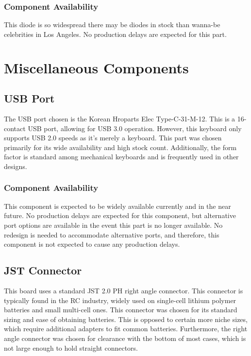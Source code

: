 \documentclass[11pt]{article}
\begin{document}
\subsubsection{Component Availability} 

This diode is so widespread there may be diodes in stock than wanna-be celebrities in Los Angeles. No production delays are expected for this part. 

\section{Miscellaneous Components}

\subsection{USB Port}

The USB port chosen is the Korean Hroparts Elec Type-C-31-M-12. This is a 16-contact USB port, allowing for USB 3.0 operation. However, this keyboard only supports USB 2.0 speeds as it's merely a keyboard. This part was chosen primarily for its wide availability and high stock count. Additionally, the form factor is standard among mechanical keyboards and is frequently used in other designs.

\subsubsection{Component Availability}

This component is expected to be widely available currently and in the near future. No production delays are expected for this component, but alternative port options are available in the event this part is no longer available. No redesign is needed to accommodate alternative ports, and therefore, this component is not expected to cause any production delays.

\subsection{JST Connector}

This board uses a standard JST 2.0 PH right angle connector. This connector is typically found in the RC industry, widely used on single-cell lithium polymer batteries and small multi-cell ones. This connector was chosen for its standard sizing and ease of obtaining batteries. This is opposed to certain more niche sizes, which require additional adapters to fit common batteries. Furthermore, the right angle connector was chosen for clearance with the bottom of most cases, which is not large enough to hold straight connectors. 
\end{document}
